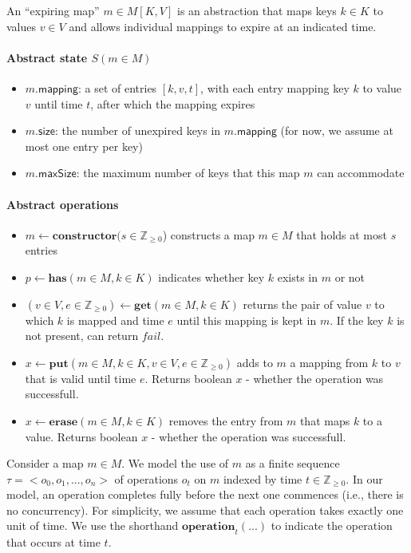 \documentclass{article}
\renewcommand{\o}[1]{\ensuremath{\mathbf{#1}}}
\newcommand{\s}[1]{\ensuremath{\mathsf{#1}}}
\newcommand{\nintset}{\ensuremath{\mathds{Z}_{\ge 0}}}
\begin{document}
An ``expiring map'' $m \in M[K,V]$ is an abstraction that maps keys $k \in K$ to values $v \in V$ and allows individual mappings to expire at an indicated time.

\paragraph{Abstract state $S(m\in M)$}
\begin{itemize}
   \item $m$.\s{mapping}: a set of entries $[k,v,t]$, with each entry mapping key $k$ to value $v$ until time $t$, after which the mapping expires
   \item $m$.\s{size}: the number of unexpired keys in $m$.\s{mapping} (for now, we assume at most one entry per key)
   \item $m$.\s{maxSize}: the maximum number of keys that this map $m$ can accommodate
\end{itemize}

\paragraph{Abstract operations}
\begin{itemize}
   \item $m \gets \o{constructor}(s \in \nintset$) constructs a map $m\in M$ that holds at most $s$ entries
   \item $p\gets \o{has}(m \in M, k \in K)$ indicates whether key $k$ exists in $m$ or not
   \item $(v\in V, e\in \nintset)\gets \o{get}(m \in M, k \in K)$ returns the pair of value $v$ to which $k$ is mapped and time $e$ until this mapping is kept in $m$. If the key $k$ is not present, can return $fail$.
   \item $x\gets \o{put}(m \in M, k \in K, v \in V, e \in \nintset)$ adds to $m$ a mapping from $k$ to $v$ that is valid until time $e$. Returns boolean $x$ - whether the operation was successfull.
   \item $x\gets \o{erase}(m\in M, k \in K)$ removes the entry from $m$ that maps $k$ to a value. Returns boolean $x$ - whether the operation was successfull.
\end{itemize}

Consider a map $m\in M$.  We model the use of $m$ as a finite sequence 
$\tau = <o_0, o_1, ..., o_n>$
of operations $o_t$ on $m$ indexed by time $t \in \nintset$. 
In our model, an operation completes fully before the next one commences (i.e., there is no concurrency).
For simplicity, we assume that each operation takes exactly one unit of time.
We use the shorthand $\o{operation}_t(...)$ to indicate the operation that occurs at time $t$.  
\end{document}
